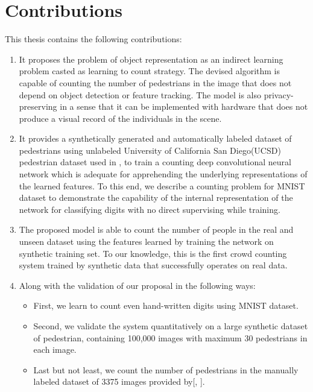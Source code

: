\section{Contributions}
This thesis contains the following contributions:
\begin{enumerate}
	\item It proposes the problem of object representation as an indirect learning problem casted as learning to count strategy. The devised algorithm is capable of counting the number of pedestrians in the image that does not depend on object detection or feature tracking. The model is also privacy-preserving in a sense that it can be implemented with hardware that does not produce a visual record of the individuals in the scene. 
	\item It provides a synthetically generated and automatically labeled dataset of pedestrians using unlabeled University of California San Diego(UCSD) pedestrian dataset used in \cite{mahadevan2010anomaly}, to train a counting deep convolutional neural network which is adequate for apprehending the underlying representations of the learned features. To this end, we describe a counting problem for MNIST dataset to demonstrate the capability of the internal representation of the network for classifying digits with no direct supervising while training. 
	\item The proposed model is able to count the number of people in the real and unseen dataset using the features learned by training the network on synthetic training set. To our knowledge, this is the first crowd counting system trained by synthetic data that successfully operates on real data. 
	\item Along with the validation of our proposal in the following ways:
	\begin{itemize}
		\item First, we learn to count even hand-written digits using MNIST dataset. 
		\item Second, we validate the system quantitatively on a large synthetic dataset of pedestrian, containing 100,000 images with maximum 30 pedestrians in each image. 
		\item Last but not least, we count the number of pedestrians in the manually labeled dataset of 3375 images provided by[\citeauthor*{chan2013ground}, \citeyear{chan2013ground}]. 
	\end{itemize}
	
\end{enumerate}

